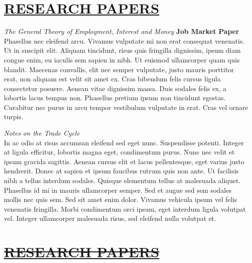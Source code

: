 \documentclass{res} %
\providecommand{\DIFaddtex}[1]{{\protect\color{blue}\uwave{#1}}} %
\providecommand{\DIFdeltex}[1]{{\protect\color{red}\sout{#1}}}                      %
\providecommand{\DIFaddbegin}{} %
\providecommand{\DIFaddend}{} %
\providecommand{\DIFdelbegin}{} %
\providecommand{\DIFdelend}{} %
\providecommand{\DIFadd}[1]{\texorpdfstring{\DIFaddtex{#1}}{#1}} %
\providecommand{\DIFdel}[1]{\texorpdfstring{\DIFdeltex{#1}}{}} %
\begin{document}
\begin{resume}
\section{\scshape \underline{RESEARCH PAPERS}} 
\vspace{6pt}

\noindent \emph{The General Theory of Employment, Interest and Money  }\hfill {\bf Job Market Paper}  \\
Phasellus nec eleifend arcu. Vivamus vulputate mi non erat consequat venenatis. Ut in suscipit elit. Aliquam tincidunt, risus quis fringilla dignissim, ipsum diam congue enim, eu iaculis sem sapien in nibh. Ut euismod ullamcorper quam quis blandit. Maecenas convallis, elit nec semper vulputate, justo mauris porttitor erat, non aliquam est velit sit amet ex. Cras bibendum felis cursus ligula consectetur posuere. Aenean vitae dignissim massa. Duis sodales felis ex, a lobortis lacus tempus non. Phasellus pretium ipsum non tincidunt egestas. Curabitur nec purus in arcu tempor vestibulum vulputate in erat. Cras vel ornare turpis. \par

\vspace{6pt} %

\noindent \emph{Notes on the Trade Cycle}      \hfill   \\
In ac odio at risus accumsan eleifend sed eget nunc. Suspendisse potenti. Integer at ligula efficitur, lobortis magna eget, condimentum purus. Nunc nec velit et ipsum gravida sagittis. Aenean cursus elit et lacus pellentesque, eget varius justo hendrerit. Donec at sapien et ipsum faucibus rutrum quis non ante. Ut facilisis nibh a tellus interdum sodales. Quisque elementum tellus at malesuada aliquet. Phasellus id mi in mauris ullamcorper semper. Sed et augue sed sem sodales mollis nec quis sem. Sed sit amet enim dolor. Vivamus vehicula ipsum vel felis venenatis fringilla. Morbi condimentum orci ipsum, eget interdum ligula volutpat vel. Integer ullamcorper malesuada risus, sed eleifend nulla volutpat et.
\vspace{10pt} %

\vspace{-.2cm}
\section{\scshape \DIFdelbegin \underline{\DIFdel{RESEARCH PAPERS}}%
\DIFdelend \DIFaddbegin \underline{\DIFadd{TEACHING EXPERIENCE}}\DIFaddend } 
\DIFdelbegin %
\DIFdelend \DIFaddbegin \vspace{8pt}
\DIFaddend 


\end{resume}
\end{document}
